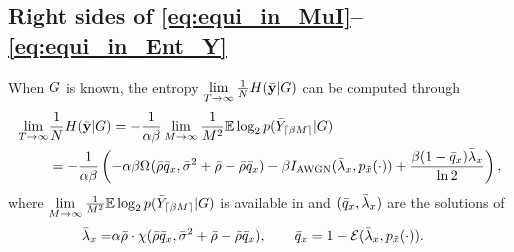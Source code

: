 \documentclass[12pt, draftclsnofoot,journal,onecolumn]{IEEEtran}
\begin{document}
\subsection{Right sides of \eqref{eq:equi_in_MuI}--\eqref{eq:equi_in_Ent_Y}}
\label{sec:Ent_known_G}
When $G$ is known, the entropy $\lim\limits_{T\to\infty}\frac{1}{N}H(\bar{{\mathbf{y}}}|G)$ can be computed through 
\begin{equation}
\begin{split}
        \lim\limits_{\Tlim\to\infty}&\frac{1}{\rn}\Ent(\rxvequ|\chm)=-\frac{1}{\ratio\beta}\lim_{\tn\to\infty}\frac{1}{\tn^2}\E\log_2 p(\rxmequ_{\ceil{\beta\tn}}|\chm)
  \\
    &=-\frac{1}{\ratio\beta}\left(-\ratio\beta\Enta[](\snrequ\qxequ,\varnsequ+\snrequ-\snrequ\qxequ)-\beta\IAWGN(\qxtildeequ,\ptx(\cdot))+\frac{\beta(1-\qxequ)\qxtildeequ}{\ln2}\right),
\end{split}
      \label{eq:entropy_known&known_G_block_entropy}
\end{equation}
where $\lim\limits_{M\to\infty}\frac{1}{M^2}\mathbb{E}\log_2 p(\bar{Y}_{\lceil\beta M\rceil}|G)$ is available in \cite{wen2016bayes} and $(\bar{q}_{ x},\bar{\lambda}_x)$ are the solutions of
\begin{align}
    \bar{\lambda}_x=&\alpha\bar{\rho}\cdot\chi({\bar{\rho}\bar{q}_{ x}},\bar{\sigma}_{}^2+\bar{\rho}-\bar{\rho}\bar{q}_{ x}),\qquad\bar{q}_{ x}=1-\mathcal{E}(\bar{\lambda}_x,p_{\tilde{x}}(\cdot)).
    \label{eq:qx_solu_known_G}
\end{align}
\end{document}
